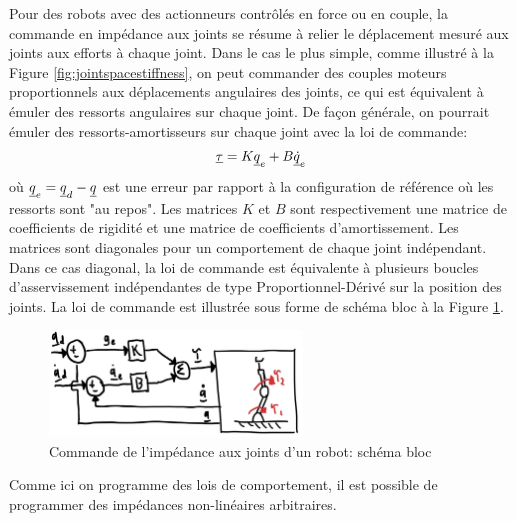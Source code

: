 Pour des robots avec des actionneurs contrôlés en force ou en couple, la commande en impédance aux joints se résume à relier le déplacement mesuré aux joints aux efforts à chaque joint. Dans le cas le plus simple, comme illustré à la Figure \ref{fig:jointspacestiffness}, on peut commander des couples moteurs proportionnels aux déplacements angulaires des joints, ce qui est équivalent à émuler des ressorts angulaires sur chaque joint. De façon générale, on pourrait émuler des ressorts-amortisseurs sur chaque joint avec la loi de commande:
\begin{align}
	\underline{\tau} = K \underline{q}_e + B \underline{\dot{q}}_e
	\label{eq:jointspaceimpe}
\end{align}
où $\underline{q}_e = \underline{q}_d - \underline{q}$ est une erreur par rapport à la configuration de référence où les ressorts sont "au repos". Les matrices $K$ et $B$ sont respectivement une matrice de coefficients de rigidité et une matrice de coefficients d'amortissement. Les matrices sont diagonales pour un comportement de chaque joint indépendant. Dans ce cas diagonal, la loi de commande est équivalente à plusieurs boucles d'asservissement indépendantes de type Proportionnel-Dérivé sur la position des joints. La loi de commande est illustrée sous forme de schéma bloc à la Figure \ref{fig:impedancecontroljoint}.
\begin{figure}[h]
	\centering
	\includegraphics[width=0.6\textwidth]{fig/impedancecontroljoint.jpg}
	\caption{Commande de l'impédance aux joints d'un robot: schéma bloc}
	\label{fig:impedancecontroljoint}
\end{figure}
Comme ici on programme des lois de comportement, il est possible de programmer des impédances non-linéaires arbitraires.

